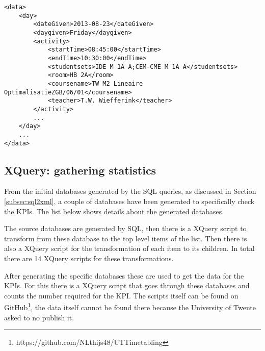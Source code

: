 \begin{lstlisting}[caption=XML structure, label=lst:xmlStructure, float=htpb]
<data>
	<day>
		<dateGiven>2013-08-23</dateGiven>
		<daygiven>Friday</daygiven>
		<activity>
			<startTime>08:45:00</startTime>
			<endTime>10:30:00</endTime>
			<studentsets>IDE M 1A A;CEM-CME M 1A A</studentsets>
			<room>HB 2A</room>
			<coursename>TW M2 Lineaire OptimalisatieZGB/06/01</coursename>
			<teacher>T.W. Wiefferink</teacher>
		</activity>
		...
	</day>
	...
</data>
\end{lstlisting}

\subsection{XQuery: gathering statistics} \label{subsec:xquery}
From the initial databases generated by the SQL queries, as discussed in Section \ref{subsec:sql2xml}, a couple of databases have been generated to specifically check the KPIs. The list below shows details about the generated databases. 

The source databases are generated by SQL, then there is a XQuery script to transform from these database to the top level items of the list. Then there is also a XQuery script for the transformation of each item to its children. In total there are 14 XQuery scripts for these transformations.

After generating the specific databases these are used to get the data for the KPIs. For this there is a XQuery script that goes through these databases and counts the number required for the KPI. The scripts itself can be found on GitHub\footnote{https://github.com/NLthijs48/UTTimetabling}, the data itself cannot be found there because the University of Twente asked to no publish it.

